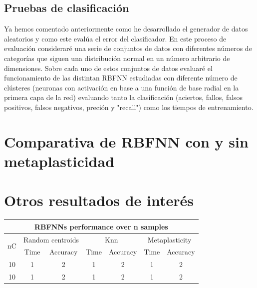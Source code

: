 \documentclass[10pt,a4paper]{report}
\begin{document}
\subsection{Pruebas de clasificación}
Ya hemos comentado anteriormente como he desarrollado el generador de datos aleatorios y como este evalúa el error del clasificador. En este proceso de evaluación consideraré una serie de conjuntos de datos con diferentes números de categorías que siguen una distribución normal en un número arbitrario de dimensiones. Sobre cada uno de estos conjuntos de datos evaluaré el funcionamiento de las distintan RBFNN estudiadas con diferente número de clústeres (neuronas con activación en base a una función de base radial en la primera capa de la red) evaluando tanto la clasificación (aciertos, fallos, falsos positivos, falsos negativos, preción y "recall") como los tiempos de entrenamiento.

\section{Comparativa de RBFNN con y sin metaplasticidad}
\section{Otros resultados de interés}

\onecolumn
\begin{center}\begin{tabular}{|c|c|c|c|c|c|c|}
	\hline
	\multicolumn{7}{|c|}{RBFNNs performance over n samples} \\
	\hline
	\multirow{2}{*}{nC} & \multicolumn{2}{|c|}{Random centroids} & \multicolumn{2}{|c|}{Knn} & \multicolumn{2}{|c|}{Metaplasticity} \\
	& Time & Accuracy & Time & Accuracy & Time & Accuracy \\
	\hline
	10 & 1 & 2 & 1 & 2 & 1 & 2 \\
	10 & 1 & 2 & 1 & 2 & 1 & 2 \\
	\hline
\end{tabular}\end{center}
\twocolumn
\end{document}

